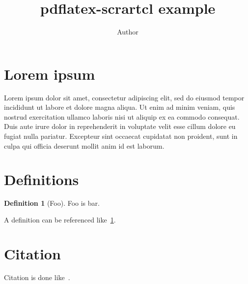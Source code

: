 \documentclass[paper=a4]{scrartcl}
\title{pdflatex-scrartcl example}
\author{Author}
\theoremstyle{definition}
\newtheorem{definition}{Definition}[section]
\begin{document}
\maketitle

\section{Lorem ipsum}

Lorem ipsum dolor sit amet, consectetur adipiscing elit, sed do eiusmod tempor incididunt ut labore et dolore magna aliqua. Ut enim ad minim veniam, quis nostrud exercitation ullamco laboris nisi ut aliquip ex ea commodo consequat. Duis aute irure dolor in reprehenderit in voluptate velit esse cillum dolore eu fugiat nulla pariatur. Excepteur sint occaecat cupidatat non proident, sunt in culpa qui officia deserunt mollit anim id est laborum.

\section{Definitions}

\begin{definition}[Foo]\label{def:foo}
  Foo is bar.
\end{definition}

A definition can be referenced like~\cref{def:foo}.

\section{Citation}

Citation is done like~\cite{CWM1978}.



\end{document}
